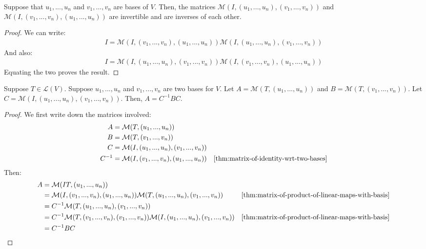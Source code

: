 \documentclass{article}
\begin{document}
\begin{theorem}
  \label{thm:matrix-of-identity-wrt-two-bases}
  Suppose that $u_1, ..., u_n$ and $v_1, ..., v_n$ are bases of
  $V$. Then, the matrices $\mathcal{M}(I, (u_1, ..., u_n), (v_1, ...,
  v_n))$ and $\mathcal{M}(I, (v_1, ..., v_n), (u_1, ..., u_n))$ are
  invertible and are inverses of each other.
\end{theorem}
\begin{proof}
  We can write:
  \begin{align*}
    I = \mathcal{M}(I, (v_1, ..., v_n), (u_1, ..., u_n))
    \mathcal{M}(I, (u_1, ..., u_n), (v_1, ..., v_n))
  \end{align*}
  And also:
  \begin{align*}
    I = \mathcal{M}(I, (u_1, ..., u_n), (v_1, ..., v_n))
    \mathcal{M}(I, (v_1, ..., v_n), (u_1, ..., u_n))
  \end{align*}
  Equating the two proves the result.
\end{proof}

\begin{theorem}
  \label{thm:change-of-basis-formula}
  Suppose $T \in \mathcal{L}(V)$. Suppose $u_1, ..., u_n$ and $v_1,
  ..., v_n$ are two bases for $V$. Let $A = \mathcal{M}(T, (u_1, ...,
  u_n))$ and $B = \mathcal{M}(T, (v_1, ..., v_n))$. Let $C =
  \mathcal{M}(I, (u_1, ..., u_n), (v_1, ..., v_n))$. Then, $A = C^{-1}BC$.
\end{theorem}
\begin{proof}
  We first write down the matrices involved:
  \begin{align*}
    A &= \mathcal{M}(T, (u_1, ..., u_n)) \\
    B &= \mathcal{M}(T, (v_1, ..., v_n)) \\
    C &= \mathcal{M}(I, (u_1, ..., u_n), (v_1, ..., v_n)) \\
    C^{-1} &= \mathcal{M}(I, (v_1, ..., v_n), (u_1, ..., u_n)) &
                                                                 \text{\cref{thm:matrix-of-identity-wrt-two-bases}} \\
  \end{align*}
  Then:
  \begin{align*}
    A &= \mathcal{M}(IT, (u_1, ..., u_n)) \\
      &= \mathcal{M}(I, (v_1, ..., v_n), (u_1,...,u_n)) \mathcal{M}(T,
        (u_1, ..., u_n), (v_1, ..., v_n))  & \text{\cref{thm:matrix-of-product-of-linear-maps-with-basis}}\\
      &= C^{-1}\mathcal{M}(T, (u_1, ..., u_n), (v_1, ..., v_n)) \\
    &= C^{-1}\mathcal{M}(T, (v_1, ..., v_n), (v_1, ..., v_n))
      \mathcal{M}(I, (u_1, ..., u_n), (v_1,...,v_n)) &
                                                       \text{\cref{thm:matrix-of-product-of-linear-maps-with-basis}}
    \\
    &= C^{-1}BC
  \end{align*}
\end{proof}
\end{document}
